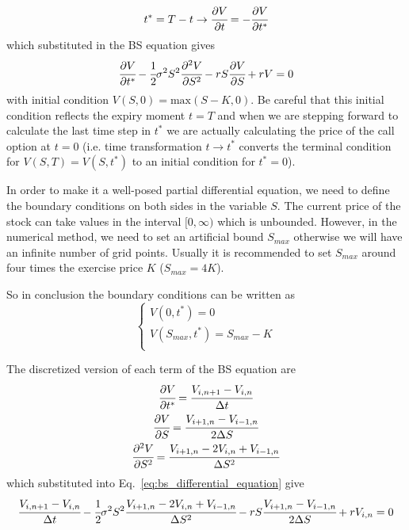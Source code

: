 \begin{equation}
t^* = T - t \rightarrow \cfrac{\partial V}{\partial t} = -\cfrac{\partial V}{\partial t^*} 
\end{equation}
\noindent
which substituted in the BS equation gives
\begin{equation}
\cfrac{\partial V}{\partial t^*} - \cfrac{1}{2} \sigma^2 S^2 \cfrac{\partial^2 V}{\partial S^2} - rS \cfrac{\partial V}{\partial S} + rV = 0
\end{equation}
\noindent
with initial condition $V(S,0)=\textrm{max}(S-K, 0)$. Be careful that this initial condition reflects the expiry moment $t=T$ and when we are stepping forward to calculate the last time step in $t^*$ we are actually calculating the price of the call option at $t=0$ (i.e. time transformation $t\rightarrow t^*$ converts the terminal condition for $V(S, T) = V(S, t^*)$ to an initial condition for $t^* = 0$).

In order to make it a well-posed partial differential equation, we need to define the boundary conditions on both sides in the variable $S$. The current price of the stock can take values in the interval $[0, \infty)$ which is unbounded. However, in the numerical method, we need to set an artificial bound $S_{max}$ otherwise we will have an infinite number of grid points. Usually it is recommended to set $S_{max}$ around four times the exercise price $K$ ($S_{max} = 4K$).

So in conclusion the boundary conditions can be written as
\begin{equation}
\begin{cases}
V(0, t^*) = 0 \\
V(S_{max}, t^*) = S_{max} - K \\
\end{cases}
\end{equation}

The discretized version of each term of the BS equation are
\begin{gather}
\cfrac{\partial V}{\partial t^*} = \cfrac{V_{i, n+1}-V_{i, n}}{\Delta t} \\
\cfrac{\partial V}{\partial S} = \cfrac{V_{i+1, n}-V_{i-1, n}}{2\Delta S} \\
\cfrac{\partial^2 V}{\partial S^2} = \cfrac{V_{i+1, n}-2V_{i, n}+V_{i-1, n}}{\Delta S^2}
\end{gather}
\noindent
which substituted into Eq.~\ref{eq:bs_differential_equation} give
\begin{equation}
\cfrac{V_{i, n+1}-V_{i, n}}{\Delta t} - \cfrac{1}{2}\sigma^2 S^2
\cfrac{V_{i+1, n}-2V_{i, n}+V_{i-1, n}}{\Delta S^2} - rS
\cfrac{V_{i+1,n}-V_{i-1,n}}{2\Delta S} + rV_{i,n} = 0
\end{equation}

